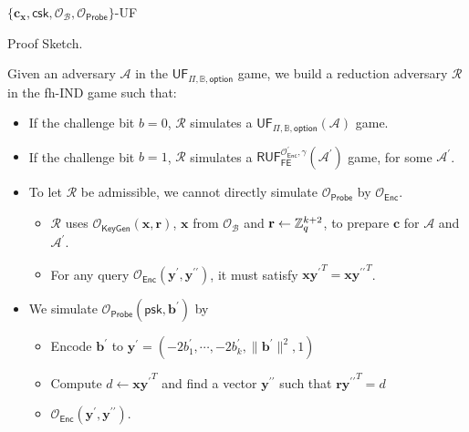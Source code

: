 \begin{frame}{$\{ \mathbf{c_x}, \textsf{csk}, \mathcal{O}_\mathcal{B}, \mathcal{O}_{\textsf{Probe}} \}$-UF}

\begin{block}{Proof Sketch.}

Given an adversary $\mathcal{A}$ in the $\textsf{UF}_{\Pi, \mathbb{B}, \textsf{option}}$ game, we build a reduction adversary $\mathcal{R}$ in the fh-IND game such that:

\begin{itemize}
	\item<2-> If the challenge bit $b = 0$, $\mathcal{R}$ simulates a $\textsf{UF}_{\Pi, \mathbb{B}, \textsf{option}}(\mathcal{A})$ game.

	\item<2-> If the challenge bit $b = 1$, $\mathcal{R}$ simulates a $\textsf{RUF}^{\mathcal{O}^\prime_{\textsf{Enc}}, \gamma}_{\textsf{FE}}(\mathcal{A}^\prime)$ game, for some $\mathcal{A}^\prime$.

	\item<3-> To let $\mathcal{R}$ be admissible, we cannot directly simulate $\mathcal{O}_{\textsf{Probe}}$ by $\mathcal{O}_{\textsf{Enc}}$.
	\begin{itemize}
		\item $\mathcal{R}$ uses $\mathcal{O}_{\textsf{KeyGen}}(\mathbf{x}, \mathbf{r})$, $\mathbf{x}$ from $\mathcal{O}_\mathcal{B}$ and $\mathbf{r} \gets \mathbb{Z}_q^{k+2}$, to prepare $\mathbf{c}$ for $\mathcal{A}$ and $\mathcal{A}^\prime$.
		\item For any query $\mathcal{O}_{\textsf{Enc}}(\mathbf{y}^\prime, \mathbf{y}^{\prime\prime})$, it must satisfy $\mathbf{x} {\mathbf{y}^\prime}^T = \mathbf{x} {\mathbf{y}^{\prime\prime}}^T$.
	\end{itemize}

	\item<4-> We simulate $\mathcal{O}_{\textsf{Probe}}( \textsf{psk}, \mathbf{b}^\prime )$ by
	\begin{itemize}
		\item Encode $\mathbf{b}^\prime$ to $\mathbf{y}^\prime = (-2b_1^\prime, \cdots, \allowbreak -2b_k^\prime, \|\mathbf{b}^\prime\|^2, 1)$
		\item Compute $d \gets \mathbf{x}{\mathbf{y}^\prime}^T$ and find a vector $\mathbf{y}^{\prime\prime}$ such that $\mathbf{r}{\mathbf{y}^{\prime\prime}}^T = d$
		\item $\mathcal{O}_{\textsf{Enc}}(\mathbf{y}^\prime, {\mathbf{y}^{\prime\prime}})$.
	\end{itemize}

\end{itemize}
\end{block}

\end{frame}


